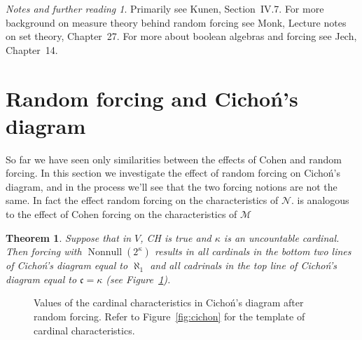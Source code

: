 \documentclass[11pt,oneside,a4paper]{amsbook}
\newcommand{\Null}{\mathcal N}
\newcommand{\Meager}{\mathcal M}
\DeclareMathOperator{\Nonnull}{Nonnull}
\theoremstyle{definition}
\theoremstyle{plain}
\newtheorem{theorem}{Theorem}[section]
\theoremstyle{definition}
\theoremstyle{remark}
\newtheorem*{notes}{Notes and further reading}
\numberwithin{equation}{section}
\numberwithin{figure}{section}
\begin{document}
\begin{notes}
  Primarily see Kunen, Section~IV.7. For more background on measure theory behind random forcing see Monk, Lecture notes on set theory, Chapter~27. For more about boolean algebras and forcing see Jech, Chapter~14.
\end{notes}


\newpage
\section{Random forcing and Cicho\'n's diagram}

So far we have seen only similarities between the effects of Cohen and random forcing. In this section we investigate the effect of random forcing on Cicho\'n's diagram, and in the process we'll see that the two forcing notions are not the same. In fact the effect random forcing on the characteristics of $\Null$.  is analogous to the effect of Cohen forcing on the characteristics of $\Meager$

\begin{theorem}
  \label{thm:random-cichon}
  Suppose that in $V$, CH is true and $\kappa$ is an uncountable cardinal. Then forcing with $\Nonnull(2^\kappa)$ results in all cardinals in the bottom two lines of Cicho\'n's diagram equal to $\aleph_1$ and all cadrinals in the top line of Cicho\'n's diagram equal to $\mathfrak c=\kappa$ (see Figure~\ref{fig:cichon-random}).
\end{theorem}

\begin{figure}[h]
  \caption{Values of the cardinal characteristics in Cicho\'n's diagram after random forcing. Refer to Figure~\ref{fig:cichon} for the template of cardinal characteristics.\label{fig:cichon-random}}
\end{figure}
\end{document}
